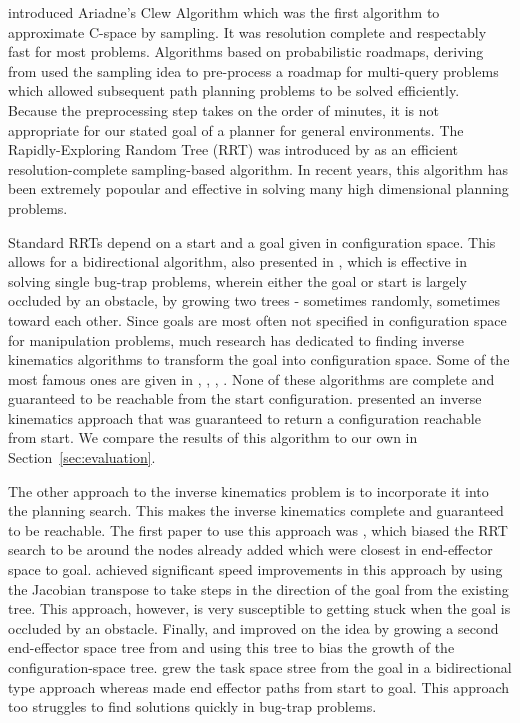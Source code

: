 \documentclass[conference]{IEEEtran}
\begin{document}
\cite{bessiere93} introduced Ariadne's Clew Algorithm which was the first algorithm to approximate C-space by sampling. It was resolution
complete and respectably fast for most problems. Algorithms based on probabilistic roadmaps, deriving from \cite{amato96} used the sampling
idea to pre-process a roadmap for multi-query problems which allowed subsequent path planning problems to be solved efficiently. Because the
preprocessing step takes on the order of minutes, it is not appropriate for our stated goal of a planner for general environments. The
Rapidly-Exploring Random Tree (RRT) was introduced by \cite{lavalle00} as an efficient resolution-complete sampling-based algorithm. In
recent years, this algorithm has been extremely popoular and effective in solving many high dimensional planning problems.

Standard RRTs depend on a start and a goal given in configuration space. This allows for a bidirectional algorithm, also presented in
\cite{lavalle00}, which is effective in solving single bug-trap problems, wherein either the goal or start is largely occluded by an
obstacle, by growing two trees - sometimes randomly, sometimes toward each other. Since goals are most often not specified in configuration
space for manipulation problems, much research has dedicated to finding inverse kinematics algorithms to transform the goal into
configuration space. Some of the most famous ones are given in \cite{goldenberg85}, \cite{guez88}, \cite{chang87}, \cite{parker89}. None of
these algorithms are complete and guaranteed to be reachable from the start configuration. \cite{ahuactzin99} presented an inverse
kinematics approach that was guaranteed to return a configuration reachable from start. We compare the results of this algorithm to our own
in Section~\ref{sec:evaluation}. 

The other approach to the inverse kinematics problem is to incorporate it into the planning search. This makes the inverse kinematics
complete and guaranteed to be reachable. The first paper to use this approach was \cite{bertram06}, which biased the RRT search to be around
the nodes already added which were closest in end-effector space to goal. \cite{vande07} achieved significant speed improvements in this
approach by using the Jacobian transpose to take steps in the direction of the goal from the existing tree. This approach, however, is very
susceptible to getting stuck when the goal is occluded by an obstacle. Finally, \cite{diankov08} and \cite{yao05}  improved on the idea by
growing a second end-effector space tree from and using this tree to bias the growth of the configuration-space tree. \cite{diankov08} grew
the task space stree from the goal in a bidirectional type approach whereas \cite{yao05} made end effector paths from start to goal. This
approach too struggles to find solutions quickly in bug-trap problems.
 
\end{document}
